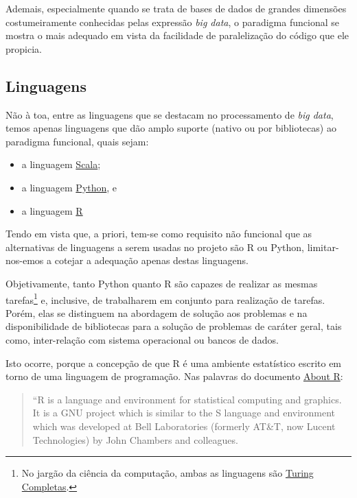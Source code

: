 \documentclass[a4paper, 12pt]{report}
\begin{document}
\begin{doublespace}
Ademais, especialmente quando se trata de bases de dados de grandes dimensões costumeiramente conhecidas pelas expressão \textit{big data}, o paradigma funcional se mostra o mais adequado em vista da facilidade de paralelização do código que ele propicia.

\subsection{Linguagens} \label{linguagens}
Não à toa, entre as linguagens que se destacam no processamento de \textit{big data}, temos apenas linguagens que dão amplo suporte (nativo ou por bibliotecas) ao paradigma funcional, quais sejam:

\begin{itemize}
    \item a linguagem \href{https://www.scala-lang.org/}{Scala};
    \item a linguagem \href{https://www.python.org/}{Python}, e
    \item a linguagem \href{https://www.r-project.org/}{R}
\end{itemize}

Tendo em vista que, a priori, tem-se como requisito não funcional que as alternativas de linguagens a serem usadas no projeto são R ou Python, limitar-nos-emos a cotejar a adequação apenas destas linguagens.

Objetivamente, tanto Python quanto R são capazes de realizar as mesmas tarefas\footnote{No jargão da ciência da computação, ambas as linguagens são \href{https://en.wikipedia.org/wiki/Turing_completeness\#:~:text=In\%20computability\%20theory\%2C\%20a\%20system,to\%20simulate\%20any\%20Turing\%20machine.}{Turing Completas}.} e, inclusive, de trabalharem em conjunto para realização de tarefas.  Porém, elas se distinguem na abordagem de solução aos problemas e na disponibilidade de bibliotecas para a solução de problemas de caráter geral, tais como, inter-relação com sistema operacional ou bancos de dados.

Isto ocorre, porque a concepção de que R é uma ambiente estatístico escrito em torno de uma linguagem de programação.  Nas palavras do documento \href{https://www.r-project.org/about.html}{About R}:

\begin{quotation}
    ``R is a language and environment for statistical computing and graphics. It is a GNU project which is similar to the S language and environment which was developed at Bell Laboratories (formerly AT\&T, now Lucent Technologies) by John Chambers and colleagues.
    

\end{quotation}
\end{doublespace}
\end{document}
